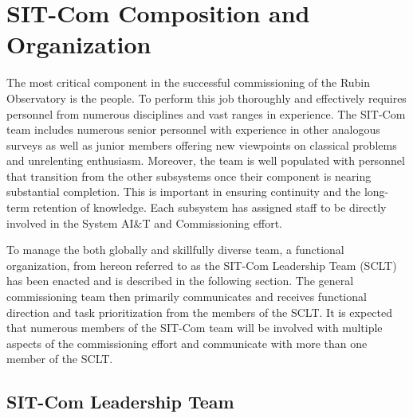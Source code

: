 \documentclass[SE,lsstdraft,authoryear,toc]{lsstdoc, lsstdraft}
\begin{document}
\section{SIT-Com Composition and Organization}
\label{sec:comp_and_org}

The most critical component in the successful commissioning of the Rubin Observatory is the people.
To perform this job thoroughly and effectively requires personnel from numerous disciplines and vast ranges in experience.
The SIT-Com team includes numerous senior personnel with experience in other analogous surveys as well as junior members offering new viewpoints on classical problems and unrelenting enthusiasm.
Moreover, the team is well populated with personnel that transition from the other subsystems once their component is nearing substantial completion.
This is important in ensuring continuity and the long-term retention of knowledge.
Each subsystem has assigned staff to be directly involved in the System AI\&T and Commissioning effort.

To manage the both globally and skillfully diverse team, a functional organization, from hereon referred to as the SIT-Com Leadership Team (SCLT) has been enacted and is described in the following section.
The general commissioning team then primarily communicates and receives functional direction and task prioritization from the members of the SCLT.
It is expected that numerous members of the SIT-Com team will be involved with multiple aspects of the commissioning effort and communicate with more than one member of the SCLT.
%



\subsection{SIT-Com Leadership Team}
\label{sec:SCLT}
\end{document}
